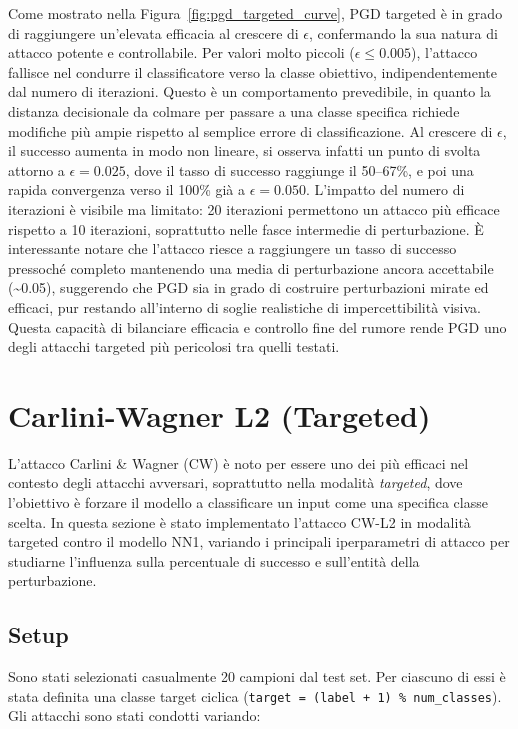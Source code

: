             \noindent Come mostrato nella Figura~\ref{fig:pgd_targeted_curve}, PGD targeted è in grado di raggiungere un’elevata efficacia al crescere di \(\epsilon\), confermando la sua natura di attacco potente e controllabile. Per valori molto piccoli (\(\epsilon \leq 0.005\)), l'attacco fallisce nel condurre il classificatore verso la classe obiettivo, indipendentemente dal numero di iterazioni. Questo è un comportamento prevedibile, in quanto la distanza decisionale da colmare per passare a una classe specifica richiede modifiche più ampie rispetto al semplice errore di classificazione.
            Al crescere di \(\epsilon\), il successo aumenta in modo non lineare, si osserva infatti un punto di svolta attorno a \(\epsilon = 0.025\), dove il tasso di successo raggiunge il 50–67\%, e poi una rapida convergenza verso il 100\% già a \(\epsilon = 0.050\). L’impatto del numero di iterazioni è visibile ma limitato: 20 iterazioni permettono un attacco più efficace rispetto a 10 iterazioni, soprattutto nelle fasce intermedie di perturbazione.
            È interessante notare che l’attacco riesce a raggiungere un tasso di successo pressoché completo mantenendo una media di perturbazione ancora accettabile (\textasciitilde{}0.05), suggerendo che PGD sia in grado di costruire perturbazioni mirate ed efficaci, pur restando all’interno di soglie realistiche di impercettibilità visiva.
            Questa capacità di bilanciare efficacia e controllo fine del rumore rende PGD uno degli attacchi targeted più pericolosi tra quelli testati.

    \section{Carlini-Wagner L2 (Targeted)}
        L’attacco Carlini \& Wagner (CW) è noto per essere uno dei più efficaci nel contesto degli attacchi avversari, soprattutto nella modalità \textit{targeted}, dove l’obiettivo è forzare il modello a classificare un input come una specifica classe scelta. In questa sezione è stato implementato l’attacco CW-L2 in modalità targeted contro il modello NN1, variando i principali iperparametri di attacco per studiarne l’influenza sulla percentuale di successo e sull’entità della perturbazione.

        \subsection{Setup}
            Sono stati selezionati casualmente 20 campioni dal test set. Per ciascuno di essi è stata definita una classe target ciclica (\texttt{target = (label + 1) \% num\_classes}). Gli attacchi sono stati condotti variando:
            
